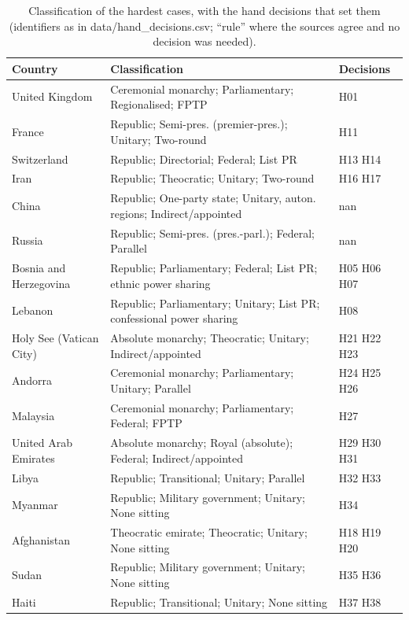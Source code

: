 \documentclass[11pt,a4paper]{article}
\begin{document}
\begin{table}[tbp]\centering\footnotesize\caption{Classification of the hardest cases, with the hand decisions that set them (identifiers as in data/hand\_decisions.csv; ``rule'' where the sources agree and no decision was needed).}\label{tab:hard}\begin{tabular}{lp{8.2cm}p{3.2cm}}\toprule Country & Classification & Decisions\\\midrule
United Kingdom & \raggedright Ceremonial monarchy; Parliamentary; Regionalised; FPTP & H01\\
France & \raggedright Republic; Semi-pres. (premier-pres.); Unitary; Two-round & H11\\
Switzerland & \raggedright Republic; Directorial; Federal; List PR & H13 H14\\
Iran & \raggedright Republic; Theocratic; Unitary; Two-round & H16 H17\\
China & \raggedright Republic; One-party state; Unitary, auton. regions; Indirect/appointed & nan\\
Russia & \raggedright Republic; Semi-pres. (pres.-parl.); Federal; Parallel & nan\\
Bosnia and Herzegovina & \raggedright Republic; Parliamentary; Federal; List PR; ethnic power sharing & H05 H06 H07\\
Lebanon & \raggedright Republic; Parliamentary; Unitary; List PR; confessional power sharing & H08\\
Holy See (Vatican City) & \raggedright Absolute monarchy; Theocratic; Unitary; Indirect/appointed & H21 H22 H23\\
Andorra & \raggedright Ceremonial monarchy; Parliamentary; Unitary; Parallel & H24 H25 H26\\
Malaysia & \raggedright Ceremonial monarchy; Parliamentary; Federal; FPTP & H27\\
United Arab Emirates & \raggedright Absolute monarchy; Royal (absolute); Federal; Indirect/appointed & H29 H30 H31\\
Libya & \raggedright Republic; Transitional; Unitary; Parallel & H32 H33\\
Myanmar & \raggedright Republic; Military government; Unitary; None sitting & H34\\
Afghanistan & \raggedright Theocratic emirate; Theocratic; Unitary; None sitting & H18 H19 H20\\
Sudan & \raggedright Republic; Military government; Unitary; None sitting & H35 H36\\
Haiti & \raggedright Republic; Transitional; Unitary; None sitting & H37 H38\\
\bottomrule\end{tabular}\end{table}
\end{document}
